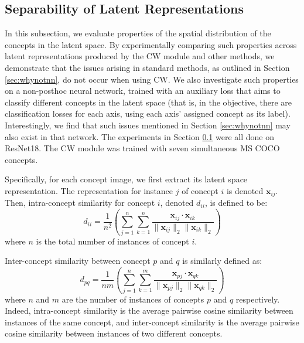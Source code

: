 \documentclass{article}
\def\x{\mathbf{x}}
\begin{document}
\subsection{Separability of Latent Representations}
\label{sec:inter_inner}
In this subsection, we evaluate properties of the spatial distribution of the concepts in the latent space. By experimentally comparing such properties across latent representations produced by the CW module and other methods, we demonstrate that the issues arising in standard methods, as outlined in Section \ref{sec:whynotnn}, do not occur when using CW. We also investigate such properties on a non-posthoc neural network, trained with an auxiliary loss
that aims to classify different concepts in the latent space  (that is, in the objective, there are classification losses for each axis, using each axis' assigned concept as its label). Interestingly, we find that such issues mentioned in Section \ref{sec:whynotnn} may also exist in that network. The experiments in Section \ref{sec:inter_inner} were all done on ResNet18. The CW module was trained with seven simultaneous MS COCO concepts.

Specifically, for each concept image, we first extract its latent space representation. The representation for instance $j$ of concept $i$ is denoted $\mathbf{x}_{ij}$. Then, intra-concept similarity for concept $i$, denoted $d_{ii}$, is defined to be:
\begin{equation}
    d_{ii} = \frac{1}{n^2}\left(\sum_{j=1}^{n} \sum_{k=1}^{n} \frac{\x_{ij}\cdot \x_{ik}}{\|\x_{ij}\|_2\|\x_{ik}\|_2}\right)
\end{equation}
where $n$ is the total number of instances of concept $i$.

Inter-concept similarity between concept $p$ and $q$ is similarly defined as:
\begin{equation}
    d_{pq} = \frac{1}{nm}\left(\sum_{j=1}^{n} \sum_{k=1}^{m} \frac{\x_{pj}\cdot \x_{qk}}{{\|\x_{pj}\|_2\|\x_{qk}\|_2}}\right)
\end{equation}
where $n$ and $m$ are the number of instances of concepts $p$ and $q$ respectively. Indeed, intra-concept similarity is the average pairwise cosine similarity between instances of the same concept, and inter-concept similarity is the average pairwise cosine similarity between instances of two different concepts. 
\end{document}
